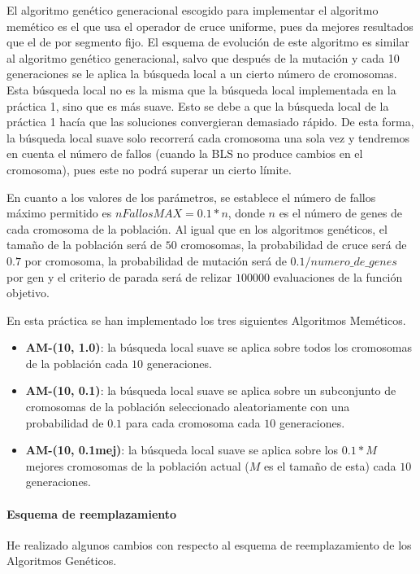 		El algoritmo genético generacional escogido para implementar el algoritmo memético es el que usa el operador de cruce uniforme, pues da mejores resultados que el de por segmento fijo.
		El esquema de evolución de este algoritmo es similar al algoritmo genético generacional, salvo que después de la mutación y cada 10 generaciones se le aplica la búsqueda local a un cierto número de cromosomas.
		Esta búsqueda local no es la misma que la búsqueda local implementada en la práctica 1, sino que es más suave. Esto se debe a que la búsqueda local de la práctica 1 hacía que las soluciones 
		convergieran demasiado rápido. De esta forma, la búsqueda local suave solo recorrerá cada cromosoma una sola vez y tendremos en cuenta el número de fallos (cuando la BLS no produce cambios en el cromosoma), pues este no podrá superar un cierto límite.
		
		En cuanto a los valores de los parámetros, se establece el número de fallos máximo permitido es $nFallosMAX = 0.1 * n$, donde $n$ es el número de genes de cada cromosoma de la población.
		Al igual que en los algoritmos genéticos, el tamaño de la población será de $50$ cromosomas, la probabilidad de cruce será de $0.7$ por cromosoma, la probabilidad de mutación será de $0.1/numero\_de\_genes$ por gen y 
		el criterio de parada será de relizar $100000$ evaluaciones de la función objetivo.

		En esta práctica se han implementado los tres siguientes Algoritmos Meméticos.

		\begin{itemize}
			\item \textbf{AM-(10, 1.0)}: la búsqueda local suave se aplica sobre todos los cromosomas de la población cada $10$ generaciones.
			\item \textbf{AM-(10, 0.1)}: la búsqueda local suave se aplica sobre un subconjunto de cromosomas de la población seleccionado aleatoriamente con una probabilidad de $0.1$ para cada cromosoma cada $10$ generaciones.
			\item \textbf{AM-(10, 0.1mej)}: la búsqueda local suave se aplica sobre los $0.1*M$ mejores cromosomas de la población actual ($M$ es el tamaño de esta) cada $10$ generaciones.
		\end{itemize}
\newpage
		\paragraph{Esquema de reemplazamiento}
		$ $\\
		He realizado algunos cambios con respecto al esquema de reemplazamiento de los Algoritmos Genéticos.

